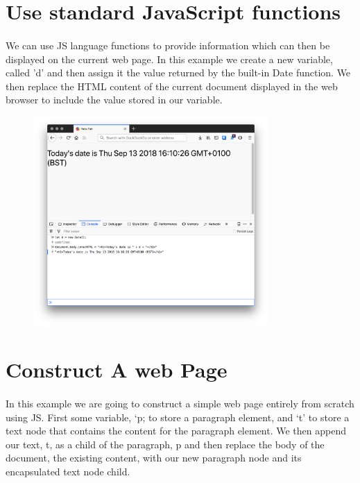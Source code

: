 \section{Use standard JavaScript functions}
\paragraph{} We can use JS language functions to provide information which can then be displayed on the current web page. In this example we create a new variable, called 'd' and then assign it the value returned by the built-in Date function. We then replace the HTML content of the current document displayed in the web browser to include the value stored in our variable.

\begin{figure}[H]
\centering
\includegraphics[width=0.8\textwidth]{figures/js-standard-functions}
\label{fig:js-standard-functions}
\caption{}
\end{figure}


\section{Construct A web Page}
\paragraph{} In this example we are going to construct a simple web page entirely from scratch using JS. First some variable, `p; to store a paragraph element, and `t' to store a text node that contains the content for the paragraph element. We then append our text, t, as a child of the paragraph, p and then replace the body of the document, the existing content, with our new paragraph node and its encapsulated text node child.

